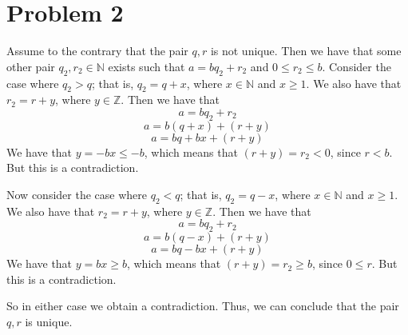 \documentclass{article}
\begin{document}
\section*{Problem 2}
Assume to the contrary that the pair $q,r$ is not unique. Then we have that
some other pair $q_2, r_2 \in \mathbb{N}$ exists such that $a = bq_2 + r_2$
and $0 \leq r_2 \leq b$. Consider the case where $q_2 > q$; that is, $q_2 = q + x$,
where $x \in \mathbb{N}$ and $x \geq 1$. We also have that $r_2 = r + y$,
where $y \in \mathbb{Z}$. Then we have that
\[ a = bq_2 + r_2 \]
\[ a = b(q + x) + (r + y) \]
\[ a = bq + bx + (r + y) \]
We have that $y = -bx \leq -b$, which means that $(r + y) = r_2 < 0$, since $r < b$.
But this is a contradiction.

Now consider the case where $q_2 < q$; that is, $q_2 = q - x$, where $x \in \mathbb{N}$
and $x \geq 1$. We also have that $r_2 = r + y$, where $y \in \mathbb{Z}$. Then
we have that
\[ a = bq_2 + r_2 \]
\[ a = b(q - x) + (r + y) \]
\[ a = bq - bx + (r + y) \]
We have that $y = bx \geq b$, which means that $(r + y) = r_2 \geq b$, since
$0 \leq r$. But this is a contradiction.

So in either case we obtain a contradiction. Thus, we can conclude that the pair
$q,r$ is unique.
\end{document}
